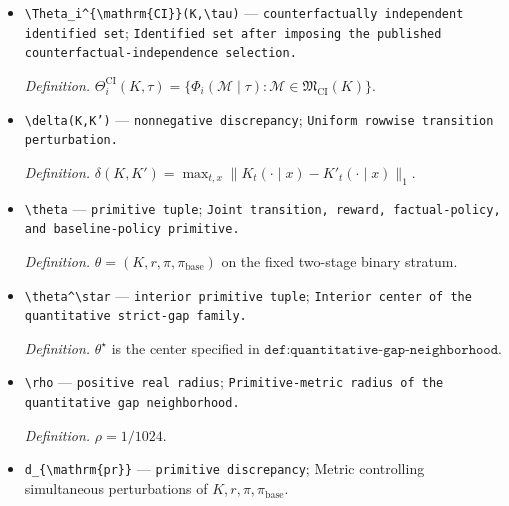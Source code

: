 \documentclass{article}
\begin{document}
\begin{itemize}
  \par\smallskip\noindent\emph{Definition.} \(q_{t,x_t}^{\mathrm{CI}}=\delta_{y_t}\) and \(q_{t,x}^{\mathrm{CI}}=K_t(\cdot\mid x)\) for \(x\ne x_t\), at every \(t\in[H]\).
  \item \texttt{\textbackslash{}\allowbreak{}Theta\_\allowbreak{}i\textasciicircum{}\{\textbackslash{}\allowbreak{}mathrm\{CI\}\allowbreak{}\}\allowbreak{}(K,\allowbreak{}\textbackslash{}\allowbreak{}tau)} --- \texttt{counterfactually independent identified set}; \texttt{Identified set after imposing the published counterfactual-\allowbreak{}independence selection.}
  \par\smallskip\noindent\emph{Definition.} \(\Theta_i^{\mathrm{CI}}(K,\tau)=\{\Phi_i(\mathcal M\mid\tau):\mathcal M\in\mathfrak M_{\mathrm{CI}}(K)\}\).
  \item \texttt{\textbackslash{}\allowbreak{}delta(K,\allowbreak{}K')} --- \texttt{nonnegative discrepancy}; \texttt{Uniform rowwise transition perturbation.}
  \par\smallskip\noindent\emph{Definition.} \(\delta(K,K')=\max_{t,x}\|K_t(\cdot\mid x)-K'_t(\cdot\mid x)\|_1\).
  \item \texttt{\textbackslash{}\allowbreak{}theta} --- \texttt{primitive tuple}; \texttt{Joint transition,\allowbreak{} reward,\allowbreak{} factual-\allowbreak{}policy,\allowbreak{} and baseline-\allowbreak{}policy primitive.}
  \par\smallskip\noindent\emph{Definition.} \(\theta=(K,r,\pi,\pi_{\mathrm{base}})\) on the fixed two-stage binary stratum.
  \item \texttt{\textbackslash{}\allowbreak{}theta\textasciicircum{}\textbackslash{}\allowbreak{}star} --- \texttt{interior primitive tuple}; \texttt{Interior center of the quantitative strict-\allowbreak{}gap family.}
  \par\smallskip\noindent\emph{Definition.} \(\theta^\star\) is the center specified in \(\texttt{def:quantitative-gap-neighborhood}\).
  \item \texttt{\textbackslash{}\allowbreak{}rho} --- \texttt{positive real radius}; \texttt{Primitive-\allowbreak{}metric radius of the quantitative gap neighborhood.}
  \par\smallskip\noindent\emph{Definition.} \(\rho=1/1024\).
  \item \texttt{d\_\allowbreak{}\{\textbackslash{}\allowbreak{}mathrm\{pr\}\allowbreak{}\}\allowbreak{}} --- \texttt{primitive discrepancy}; Metric controlling simultaneous perturbations of \(K,r,\pi,\pi_{\mathrm{base}}\).

\end{itemize}
\end{document}
